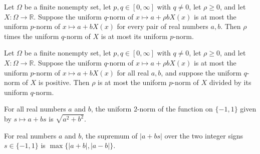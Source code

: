 \begin{theorem}
\label{FABL.IsHypercontractiveRandomVariable.rho_mul_norm_le}
\leanok
{}
Let $\Omega$ be a finite nonempty set, let $p,q\in[0,\infty]$ with $q\ne0$, let
$\rho\ge0$, and let $X:\Omega\to\mathbb R$. Suppose the uniform $q$-norm of $x\mapsto
a+\rho bX(x)$ is at most the uniform $p$-norm of $x\mapsto a+bX(x)$ for every pair of
real numbers $a,b$. Then $\rho$ times the uniform $q$-norm of $X$ is at most its uniform
$p$-norm.
\end{theorem}

\begin{theorem}
\label{FABL.IsHypercontractiveRandomVariable.rho_le_norm_ratio}
\leanok
{}
Let $\Omega$ be a finite nonempty set, let $p,q\in[0,\infty]$ with $q\ne0$, let
$\rho\ge0$, and let $X:\Omega\to\mathbb R$. Suppose the uniform $q$-norm of $x\mapsto
a+\rho bX(x)$ is at most the uniform $p$-norm of $x\mapsto a+bX(x)$ for all real $a,b$,
and suppose the uniform $q$-norm of $X$ is positive. Then $\rho$ is at most the uniform
$p$-norm of $X$ divided by its uniform $q$-norm.
\end{theorem}

\begin{theorem}
\label{FABL.uniformLpNorm_two_affineSign}
\leanok
{}
For all real numbers $a$ and $b$, the uniform $2$-norm of the function on $\{-1,1\}$
given by $s\mapsto a+bs$ is $\sqrt{a^2+b^2}$.
\end{theorem}

\begin{theorem}
\label{FABL.uniformLInfinityNorm_affineSign}
\leanok
{}
For real numbers $a$ and $b$, the supremum of $|a+b s|$ over the two integer signs
$s\in\{-1,1\}$ is $\max\{|a+b|,|a-b|\}$.
\end{theorem}

